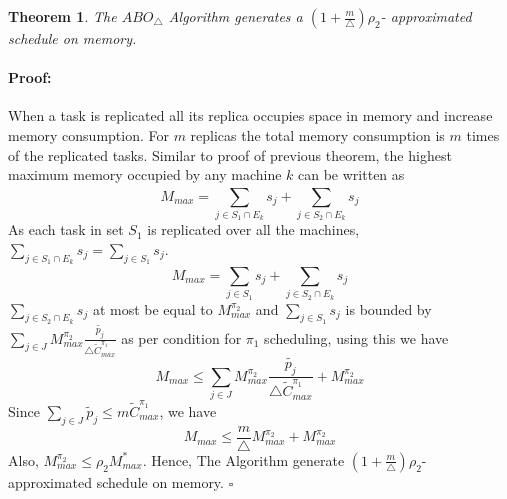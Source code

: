 \documentclass[12pt]{article}
\theoremstyle{mystyle}
\newtheorem{theorem}{Theorem}
\newenvironment{myproof}{\paragraph{Proof:}}{\hfill$\square$}
\begin{document}
               \begin{theorem}
                      \label{th:chapter5-lb}
                       The $ABO_\triangle$ Algorithm generates a $ (1+\frac{m}{\triangle})\rho_2 $- approximated schedule on memory.
                      \end{theorem}
        
             \begin{myproof}           
             When a task is replicated all its replica occupies space in memory and increase memory consumption. For $m$ replicas the total memory consumption is $m$ times of the replicated tasks. Similar to proof of previous theorem, the highest maximum memory occupied by any machine $k$ can be written as
              \begin{equation}\nonumber
              M_{max}= \sum_{j \in S_1\cap E_k}^{}s_j+\sum_{j \in S_2\cap E_k}^{}s_j           
           \end{equation}
           As each task in set $S_1$ is replicated over all the machines,$\sum\limits
           _{j \in S_1\cap E_k}^{}s_j =\sum\limits
           _{j \in S_1}^{}s_j$.              
               \begin{equation}\nonumber
                          M_{max} = \sum_{j\in S_1}^{}s_j+\sum_{j \in S_2\cap E_k}^{}s_j           
                       \end{equation}    
                        $\sum\limits_{j \in S_2\cap E_k}^{}s_j$  at most be equal to $M^{\pi_2}_{max} $ and $\sum\limits_{j\in S_1}s_j$ is bounded by $\sum\limits_{j \in J}^{} {M^{\pi_2}_{max}} \frac{\tilde{p_j}}{\triangle \tilde{C}^{\pi_1}_{max}} $ as per condition for  $\pi_1$ scheduling, using this we have    
    \begin{equation}\nonumber
    M_{max}\leq \sum_{j \in J}^{} {M^{\pi_2}_{max}} \frac{\tilde{p_j}}{\triangle \tilde{C}^{\pi_1}_{max}}+{M^{\pi_2}_{max}}
     \end{equation}
             Since $ \sum\limits_{j \in J}\tilde{p}_j \leq m\tilde{C}^{\pi_1}_{max} $, we have 
                 \begin{equation}\nonumber
     M_{max}\leq   \frac{m}{\triangle}{M^{\pi_2}_{max}}+{M^{\pi_2}_{max}}
   \end{equation}
    Also,  ${M^{\pi_2}_{max}} \leq \rho_2 {M^{*}_{max}}$.  Hence, The Algorithm generate $ (1+\frac{m}{\triangle})\rho_2 $- approximated schedule on memory.
                  \end{myproof}
                  
\end{document}
